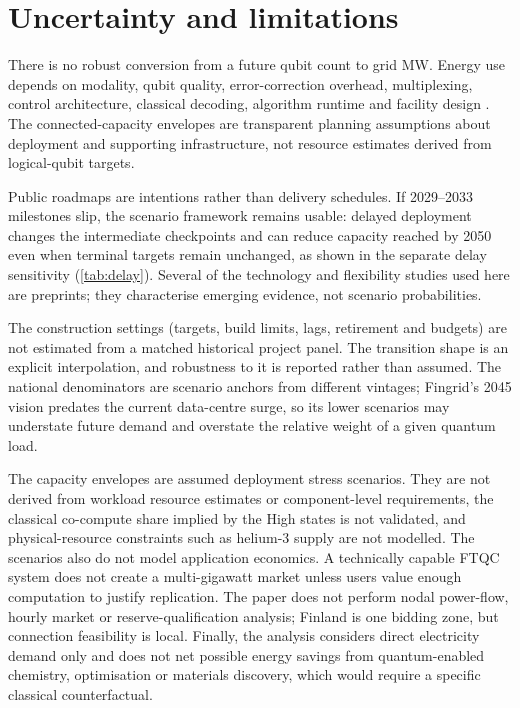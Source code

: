 \documentclass[11pt,a4paper]{article}
\begin{document}
\section{Uncertainty and limitations}
There is no robust conversion from a future qubit count to grid MW. Energy use depends on modality, qubit quality, error-correction overhead, multiplexing, control architecture, classical decoding, algorithm runtime and facility design \citep{martin2022energy,fellous2023optimizing,niu2026full,carrasco2026energy}. The connected-capacity envelopes are transparent planning assumptions about deployment and supporting infrastructure, not resource estimates derived from logical-qubit targets.

Public roadmaps are intentions rather than delivery schedules. If 2029--2033 milestones slip, the scenario framework remains usable: delayed deployment changes the intermediate checkpoints and can reduce capacity reached by 2050 even when terminal targets remain unchanged, as shown in the separate delay sensitivity (\cref{tab:delay}). Several of the technology and flexibility studies used here are preprints; they characterise emerging evidence, not scenario probabilities.

The construction settings (targets, build limits, lags, retirement and budgets) are not estimated from a matched historical project panel. The transition shape is an explicit interpolation, and robustness to it is reported rather than assumed. The national denominators are scenario anchors from different vintages; Fingrid's 2045 vision predates the current data-centre surge, so its lower scenarios may understate future demand and overstate the relative weight of a given quantum load.

The capacity envelopes are assumed deployment stress scenarios. They are not derived from workload resource estimates or component-level requirements, the classical co-compute share implied by the High states is not validated, and physical-resource constraints such as helium-3 supply are not modelled. The scenarios also do not model application economics. A technically capable FTQC system does not create a multi-gigawatt market unless users value enough computation to justify replication. The paper does not perform nodal power-flow, hourly market or reserve-qualification analysis; Finland is one bidding zone, but connection feasibility is local. Finally, the analysis considers direct electricity demand only and does not net possible energy savings from quantum-enabled chemistry, optimisation or materials discovery, which would require a specific classical counterfactual.
\end{document}
